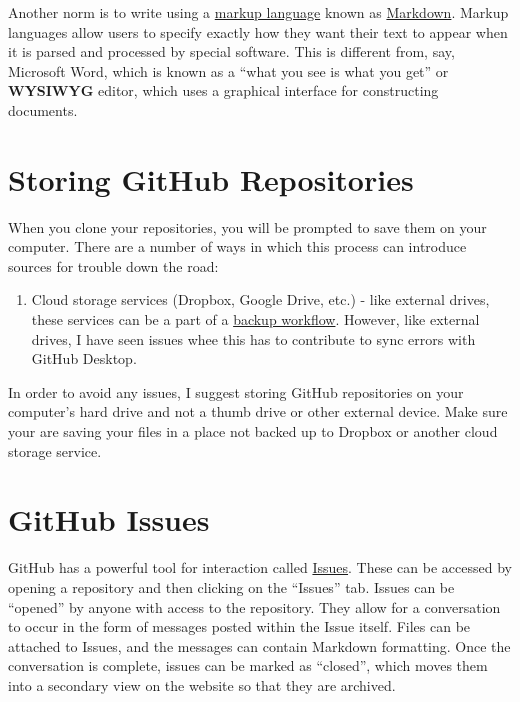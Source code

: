 \documentclass[]{book}
\providecommand{\tightlist}{%
  \setlength{\itemsep}{0pt}\setlength{\parskip}{0pt}}
\begin{document}
Another norm is to write using a
\href{https://en.wikipedia.org/wiki/Markup_language}{markup language}
known as \href{https://daringfireball.net/projects/markdown/}{Markdown}.
Markup languages allow users to specify exactly how they want their text
to appear when it is parsed and processed by special software. This is
different from, say, Microsoft Word, which is known as a ``what you see
is what you get'' or \textbf{WYSIWYG} editor, which uses a graphical
interface for constructing documents.

\section{Storing GitHub Repositories}\label{storing-github-repositories}

When you clone your repositories, you will be prompted to save them on
your computer. There are a number of ways in which this process can
introduce sources for trouble down the road:

\begin{enumerate}
\def\labelenumi{\arabic{enumi}.}
\setcounter{enumi}{1}
\tightlist
\item
  Cloud storage services (Dropbox, Google Drive, etc.) - like external
  drives, these services can be a part of a
  \href{protecting-your-work.html}{backup workflow}. However, like
  external drives, I have seen issues whee this has to contribute to
  sync errors with GitHub Desktop.
\end{enumerate}

In order to avoid any issues, I suggest storing GitHub repositories on
your computer's hard drive and not a thumb drive or other external
device. Make sure your are saving your files in a place not backed up to
Dropbox or another cloud storage service.

\section{GitHub Issues}\label{github-issues}

GitHub has a powerful tool for interaction called
\href{https://help.github.com/articles/about-issues/}{Issues}. These can
be accessed by opening a repository and then clicking on the ``Issues''
tab. Issues can be ``opened'' by anyone with access to the repository.
They allow for a conversation to occur in the form of messages posted
within the Issue itself. Files can be attached to Issues, and the
messages can contain Markdown formatting. Once the conversation is
complete, issues can be marked as ``closed'', which moves them into a
secondary view on the website so that they are archived.
\end{document}
